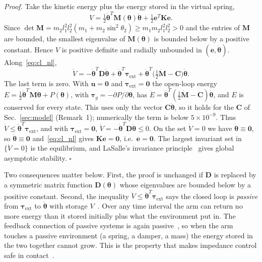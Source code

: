 \documentclass[letterpaper, 10pt, conference]{ieeeconf}
\begin{document}
\textit{Proof.} Take the kinetic energy plus the energy stored
in the virtual spring,
\begin{equation}
V=\tfrac12\dot{\boldsymbol{\theta}}^{T}\mathbf{M}(\boldsymbol{\theta})
\dot{\boldsymbol{\theta}}+\tfrac12\mathbf{e}^{T}\mathbf{K}\mathbf{e}.
\label{eq:lyap}
\end{equation}
Since $\det\mathbf{M}=m_2l_1^2l_2^2(m_1+m_2\sin^2\theta_2)\ge
m_1m_2l_1^2l_2^2>0$ and the entries of $\mathbf{M}$ are bounded,
the smallest eigenvalue of $\mathbf{M}(\boldsymbol{\theta})$ is
bounded below by a positive constant. Hence $V$ is positive
definite and radially unbounded in
$(\mathbf{e},\dot{\boldsymbol{\theta}})$. Along~\eqref{eq:cl_nl},
\[
\dot V=-\dot{\boldsymbol{\theta}}^{T}\mathbf{D}\dot{\boldsymbol{\theta}}
+\dot{\boldsymbol{\theta}}^{T}\boldsymbol{\tau}_{\mathrm{ext}}
+\dot{\boldsymbol{\theta}}^{T}\big(\tfrac12\dot{\mathbf{M}}-\mathbf{C}\big)
\dot{\boldsymbol{\theta}}.
\]
The last term is zero. With $\mathbf{u}=\mathbf{0}$ and
$\boldsymbol{\tau}_{\mathrm{ext}}=\mathbf{0}$ the open-loop energy
$E=\tfrac12\dot{\boldsymbol{\theta}}^{T}\mathbf{M}\dot{\boldsymbol{\theta}}+P(\boldsymbol{\theta})$,
with $\boldsymbol{\tau}_g=-\partial P/\partial\boldsymbol{\theta}$,
has $\dot E=\dot{\boldsymbol{\theta}}^{T}(\tfrac12\dot{\mathbf{M}}-\mathbf{C})
\dot{\boldsymbol{\theta}}$, and $E$ is conserved for every state.
This uses only the vector $\mathbf{C}\dot{\boldsymbol{\theta}}$, so it
holds for the $\mathbf{C}$ of Sec.~\ref{sec:model} (Remark~1);
numerically the term is below $5\times10^{-9}$. Thus
$\dot V\le\dot{\boldsymbol{\theta}}^{T}\boldsymbol{\tau}_{\mathrm{ext}}$,
and with $\boldsymbol{\tau}_{\mathrm{ext}}=\mathbf{0}$,
$\dot V=-\dot{\boldsymbol{\theta}}^{T}\mathbf{D}\dot{\boldsymbol{\theta}}\le0$.
On the set $\dot V=0$ we have $\dot{\boldsymbol{\theta}}\equiv\mathbf{0}$,
so $\ddot{\boldsymbol{\theta}}\equiv\mathbf{0}$ and~\eqref{eq:cl_nl}
gives $\mathbf{K}\mathbf{e}=\mathbf{0}$, i.e.\ $\mathbf{e}=\mathbf{0}$.
The largest invariant set in $\{\dot V=0\}$ is the equilibrium,
and LaSalle's invariance principle~\cite{khalil2002} gives global
asymptotic stability. \hfill$\square$

Two consequences matter below. First, the proof is unchanged
if $\mathbf{D}$ is replaced by a symmetric matrix function
$\mathbf{D}(\boldsymbol{\theta})$ whose eigenvalues are bounded below
by a positive constant. Second, the inequality
$\dot V\le\dot{\boldsymbol{\theta}}^{T}\boldsymbol{\tau}_{\mathrm{ext}}$
says the closed loop is \emph{passive} from
$\boldsymbol{\tau}_{\mathrm{ext}}$ to $\dot{\boldsymbol{\theta}}$
with storage $V$~\cite{khalil2002,spong2006}. Over any time
interval the arm can return no more energy than it stored
initially plus what the environment put in. The feedback
connection of passive systems is again passive~\cite{khalil2002},
so when the arm touches a passive environment (a spring, a
damper, a mass) the energy stored in the two together cannot
grow. This is the property that makes impedance control safe in
contact~\cite{hogan1985impedance}.
\end{document}
